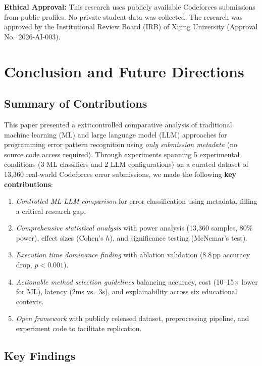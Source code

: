 \documentclass[acmsmall]{acmart}
\begin{document}
\textbf{Ethical Approval:} This research uses publicly available Codeforces
submissions from public profiles. No private student data was collected.
The research was approved by the Institutional Review Board (IRB) of
Xijing University (Approval No.~2026-AI-003).

\section{Conclusion and Future Directions}

\subsection*{Summary of Contributions}
This paper presented a 	extit{controlled comparative analysis} of
traditional machine learning (ML) and large language model (LLM) approaches
for programming error pattern recognition using \textit{only submission
metadata} (no source code access required). Through experiments spanning 5
experimental conditions (3 ML classifiers and 2 LLM configurations) on a curated dataset of
13,360 real-world Codeforces error submissions, we made the following
\textbf{key contributions}:

\begin{enumerate}
 \item \textit{Controlled ML-LLM comparison} for error classification using
 metadata, filling a critical research gap.
 \item \textit{Comprehensive statistical analysis} with power analysis
 (13,360 samples, 80\% power), effect sizes (Cohen's $h$), and
 significance testing (McNemar's test).
 \item \textit{Execution time dominance finding} with ablation validation
 (8.8\,pp accuracy drop, $p < 0.001$).
 \item \textit{Actionable method selection guidelines} balancing accuracy,
 cost (10--15$\times$ lower for ML), latency (2ms vs.\ 3s), and
 explainability across six educational contexts.
 \item \textit{Open framework} with publicly released dataset, preprocessing
 pipeline, and experiment code to facilitate replication.
\end{enumerate}

\subsection*{Key Findings}
\end{document}
